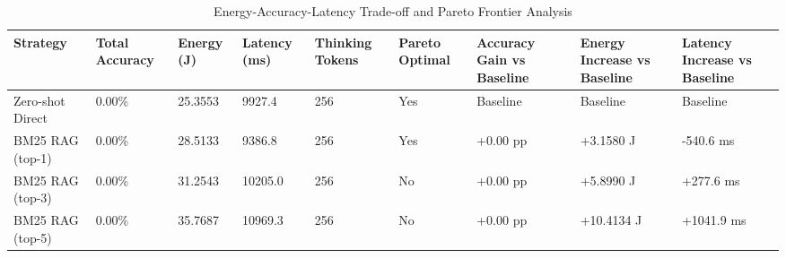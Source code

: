 \begin{table}
\caption{Energy-Accuracy-Latency Trade-off and Pareto Frontier Analysis}
\label{tab:tradeoff_comparison}
\begin{tabular}{lllllllll}
\toprule
Strategy & Total Accuracy & Energy (J) & Latency (ms) & Thinking Tokens & Pareto Optimal & Accuracy Gain vs Baseline & Energy Increase vs Baseline & Latency Increase vs Baseline \\
\midrule
Zero-shot Direct & 0.00\% & 25.3553 & 9927.4 & 256 & Yes & Baseline & Baseline & Baseline \\
BM25 RAG (top-1) & 0.00\% & 28.5133 & 9386.8 & 256 & Yes & +0.00 pp & +3.1580 J & -540.6 ms \\
BM25 RAG (top-3) & 0.00\% & 31.2543 & 10205.0 & 256 & No & +0.00 pp & +5.8990 J & +277.6 ms \\
BM25 RAG (top-5) & 0.00\% & 35.7687 & 10969.3 & 256 & No & +0.00 pp & +10.4134 J & +1041.9 ms \\
\bottomrule
\end{tabular}
\end{table}
